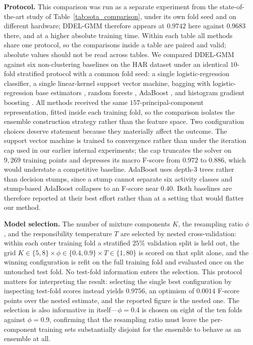 \documentclass[lettersize,journal]{IEEEtran}
\newcommand{\tfourhighlight}[1]{{\color{tier4blue}#1}}
\begin{document}
		\tfourhighlight{\noindent \textbf{Protocol.} This comparison was run as a separate experiment from the state-of-the-art study of Table~\ref{tab:sota_comparison}, under its own fold seed and on different hardware; DDEL-GMM therefore appears at $0.9742$ here against $0.9683$ there, and at a higher absolute training time. Within each table all methods share one protocol, so the comparisons inside a table are paired and valid; absolute values should not be read across tables. We compared DDEL-GMM against six non-clustering baselines on the HAR dataset under an identical $10$-fold stratified protocol with a common fold seed: a single logistic-regression classifier, a single linear-kernel support vector machine, bagging with logistic-regression base estimators \cite{breiman_bagging_1996}, random forests \cite{breiman_random_2001}, AdaBoost \cite{freund_decision-theoretic_1997}, and histogram gradient boosting \cite{friedman_greedy_2001}. All methods received the same $157$-principal-component representation, fitted inside each training fold, so the comparison isolates the ensemble construction strategy rather than the feature space. Two configuration choices deserve statement because they materially affect the outcome. The support vector machine is trained to convergence rather than under the iteration cap used in our earlier internal experiments; the cap truncates the solver on $9{,}269$ training points and depresses its macro F-score from $0.972$ to $0.886$, which would understate a competitive baseline. AdaBoost uses depth-$3$ trees rather than decision stumps, since a stump cannot separate six activity classes and stump-based AdaBoost collapses to an F-score near $0.40$. Both baselines are therefore reported at their best effort rather than at a setting that would flatter our method.

		\noindent \textbf{Model selection.} The number of mixture components $K$, the resampling ratio $\phi$, and the responsibility temperature $T$ are selected by nested cross-validation: within each outer training fold a stratified $25\%$ validation split is held out, the grid $K \in \{5,8\} \times \phi \in \{0.4,0.9\} \times T \in \{1,80\}$ is scored on that split alone, and the winning configuration is refit on the full training fold and evaluated once on the untouched test fold. No test-fold information enters the selection. This protocol matters for interpreting the result: selecting the single best configuration by inspecting test-fold scores instead yields $0.9756$, an optimism of $0.0014$ F-score points over the nested estimate, and the reported figure is the nested one. The selection is also informative in itself---$\phi = 0.4$ is chosen on eight of the ten folds against $\phi = 0.9$, confirming that the resampling ratio must leave the per-component training sets substantially disjoint for the ensemble to behave as an ensemble at all.}
		
\end{document}

